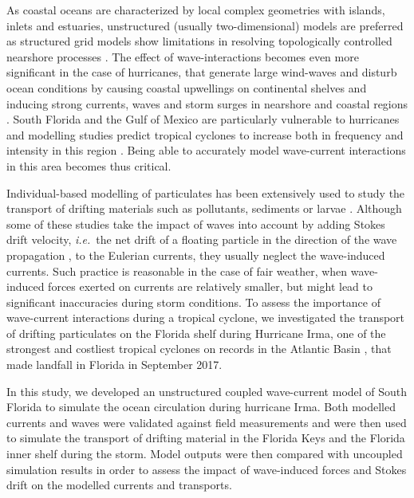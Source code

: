 \documentclass[11pt,a4paper]{article}
\newcommand{\ie}{{\it i.e.}\ }
\begin{document}
As coastal oceans are characterized by local complex geometries with islands, inlets and estuaries, unstructured (usually two-dimensional) models are preferred as structured grid models show limitations in resolving topologically controlled nearshore processes \citep{wu2011fvcom, chen2007finite}. The effect of wave-interactions becomes even more significant in the case of hurricanes, that generate large wind-waves and disturb ocean conditions \citep{liu2020impacts} by causing coastal upwellings on continental shelves \citep{smith1982response} and inducing strong currents, waves and storm surges in nearshore and coastal regions \citep{dietrich2010high, weisberg2006hurricane}. South Florida and the Gulf of Mexico are particularly vulnerable to hurricanes \citep{malmstadt2009florida} and modelling studies predict tropical cyclones to increase both in frequency and intensity in this region \citep{marsooli2019climate, knutson2010tropical}. Being able to accurately model wave-current interactions in this area becomes thus critical.

Individual-based modelling of particulates has been extensively used to study the transport of drifting materials such as pollutants, sediments or larvae \citep{garcia2020measuring,liubartseva2018tracking, figueiredo2013synthesizing, frys2020fine}. Although some of these studies take the impact of waves into account by adding Stokes drift velocity, \ie the net drift of a floating particle in the direction of the wave propagation \citep{van2018stokes}, to the Eulerian currents, they usually neglect the wave-induced currents. Such practice is reasonable in the case of fair weather, when wave-induced forces exerted on currents are relatively smaller, but might lead to significant inaccuracies during storm conditions. To assess the importance of wave-current interactions during a tropical cyclone, we investigated the transport of drifting particulates on the Florida shelf during Hurricane Irma, one of the strongest and costliest tropical cyclones on records in the Atlantic Basin \citep{chen2007finite}, that made landfall in Florida in September 2017.

In this study, we developed an unstructured coupled wave-current model of South Florida to simulate the ocean circulation during hurricane Irma. Both modelled currents and waves were validated against field measurements and were then used to simulate the transport of drifting material in the Florida Keys and the Florida inner shelf during the storm. Model outputs were then compared with uncoupled simulation results in order to assess the impact of wave-induced forces and Stokes drift on the modelled currents and transports.
\end{document}
